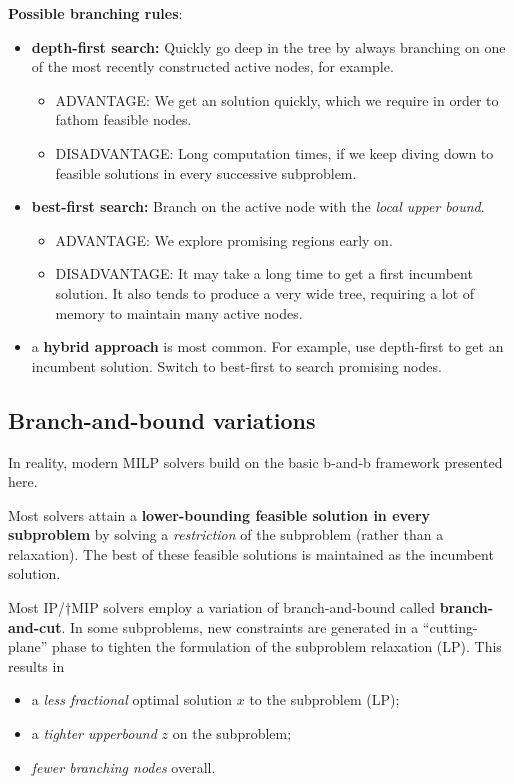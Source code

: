 \documentclass[11pt]{article}
\theoremstyle{definition}
\newcommand{\answerbox}[3]{%
  \fbox{%
    \begin{minipage}[#1]{#2}
      \hfill\vspace{#3}
    \end{minipage}
  }
}
\newcommand{\wordbox}{\answerbox{c}{1.2in}{.7cm}}
\begin{document}
\begin{tcolorbox}
\textbf{Possible branching rules}: 
\begin{itemize}
\item \textbf{depth-first search:} Quickly go deep in the tree by always branching on one of the most recently constructed active nodes, for example.
	\begin{itemize}
		\item ADVANTAGE:  We get an \wordbox solution quickly, which we require in order to fathom feasible nodes.
		\item DISADVANTAGE:  Long computation times, if we keep diving down to feasible solutions in every successive subproblem.
	\end{itemize}
\item \textbf{best-first search:} Branch on the active node with the \wordbox \emph{local upper bound}.
	\begin{itemize}
		\item ADVANTAGE:  We explore promising regions early on.
		\item DISADVANTAGE:  It may take a long time to get a first incumbent solution.  It also tends to produce a very wide tree, requiring a lot of memory to maintain many active nodes.
	\end{itemize}
\item a \textbf{hybrid approach} is most common.  For example, use depth-first to get an incumbent solution.  Switch to best-first to search promising nodes.  
\end{itemize}
\end{tcolorbox}

\newpage
\subsection{Branch-and-bound variations}
In reality, modern MILP solvers build on the basic b-and-b framework presented here.

Most solvers attain a \textbf{lower-bounding feasible solution in every subproblem} by solving a \emph{restriction} of the subproblem (rather than a relaxation).  The best of these feasible solutions is maintained as the incumbent solution.

Most IP/†MIP solvers employ a variation of branch-and-bound called \textbf{branch-and-cut}.  In some subproblems, new constraints are generated in a ``cutting-plane'' phase to tighten the formulation of the subproblem relaxation (LP).  This results in 
	\begin{itemize}
		\item a \emph{less fractional} optimal solution $x$ to the subproblem (LP);
		\item a \emph{tighter upperbound} $z$ on the subproblem;
		\item \emph{fewer branching nodes} overall.
	\end{itemize}
\end{document}
